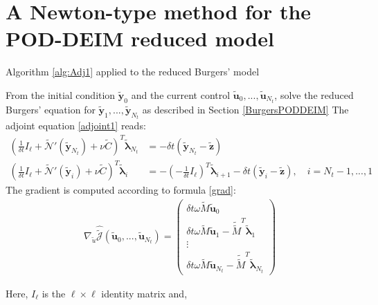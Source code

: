 \section{A Newton-type method for the POD-DEIM reduced model}
\label{Newton_red_chapter}
\begin{algorithm}[H]
\caption{Algorithm \ref{alg:Adj1} applied to the reduced Burgers' model}
\label{alg:Adj1_redBurgers}
\begin{algorithmic}[1]
\STATE From the initial condition $\mathbf{\tilde y}_0$ and the current control $\mathbf{\tilde u}_0,...,\mathbf{\tilde u}_{N_t}$, solve the reduced Burgers' equation for $\mathbf{\tilde y}_1,...,\mathbf{\tilde y}_{N_t}$ as described in Section \ref{BurgersPODDEIM}
\STATE The adjoint equation \eqref{adjoint1} reads:
\begin{subequations}
\begin{align}
\label{AdjRedOrder_term}
\left(\frac{1}{\delta \! t}I_\ell + \tilde{\mathcal{N}}'(\mathbf{\tilde{y}}_{N_t})  +  \nu \tilde{C}\right)^T \boldsymbol{\tilde{\lambda}}_{N_t} &= -\delta \! t(\mathbf{\tilde{y}}_{N_t} - \mathbf{\tilde z} )\\
\label{AdjRedOrder}
\left(\frac{1}{\delta \! t}I_\ell + \tilde{\mathcal{N}}'(\mathbf{\tilde{y}}_{i})  + \nu \tilde{C}\right)^T \boldsymbol{\tilde{\lambda}}_i &= - (-\frac{1}{\delta \! t} I_\ell)^T \boldsymbol{\tilde{\lambda}}_{i+1} -\delta \! t( \mathbf{\tilde{y}}_{i} - \mathbf{\tilde z} ), \quad i = N_t-1,...,1
\end{align}
\end{subequations}
\STATE The gradient is computed according to formula \eqref{grad}:
\begin{align}
\label{gradRedOrder}
\nabla_{\tilde u} \hat{\tilde{\mathcal J}}(\mathbf{\tilde{u}}_0,...,\mathbf{\tilde{u}}_{N_t}) = \begin{pmatrix} \delta \! t \omega \tilde{M} \mathbf{\tilde{u}}_0 \\ \delta \! t \omega \tilde{M} \mathbf{\tilde{u}}_1 - \tilde{\tilde{M}}^T \boldsymbol{\tilde{\lambda}}_1 \\ \vdots \\ \delta \! t \omega \tilde{M} \mathbf{\tilde{u}}_{N_t} - \tilde{\tilde{M}}^T \boldsymbol{\tilde{\lambda}}_{N_t} \end{pmatrix}
\end{align}
\end{algorithmic}
\end{algorithm}
Here, $I_\ell$ is the $\ell \times \ell$ identity matrix and,
